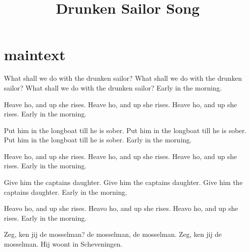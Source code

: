 
\title{Drunken Sailor Song}
\maketitle


\section{maintext}

What shall we do with the drunken sailor?
What shall we do with the drunken sailor?
What shall we do with the drunken sailor?
Early in the morning.

Heave ho, and up she rises.
Heave ho, and up she rises.
Heave ho, and up she rises.
Early in the morning.

Put him in the longboat till he is sober.
Put him in the longboat till he is sober.
Put him in the longboat till he is sober.
Early in the morning.

Heave ho, and up she rises.
Heave ho, and up she rises.
Heave ho, and up she rises.
Early in the morning.

Give him the captains daughter.
Give him the captains daughter.
Give him the captains daughter.
Early in the morning.

Heavo ho, and up she rises.
Heavo ho, and up she rises.
Heavo ho, and up she rises.
Early in the morning.

Zeg, ken jij de mosselman?
de mosselman, de mosselman.
Zeg, ken jij de mosselman.
Hij woont in Scheveningen.



